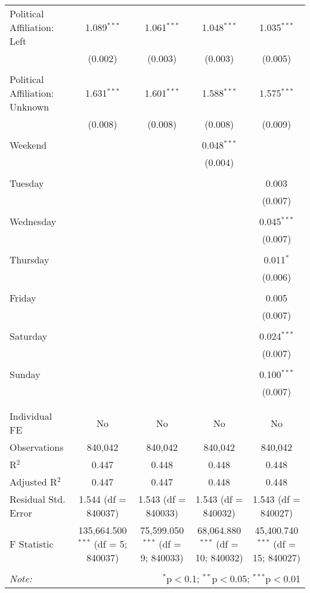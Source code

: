 \documentclass[
]{article}
\begin{document}
\begin{table}[!htbp]
{\begin{tabular}{@{\extracolsep{5pt}}lcccc}
 Political Affiliation: Left & 1.089$^{***}$ & 1.061$^{***}$ & 1.048$^{***}$ & 1.035$^{***}$ \\ 
  & (0.002) & (0.003) & (0.003) & (0.005) \\ 
  & & & & \\ 
 Political Affiliation: Unknown & 1.631$^{***}$ & 1.601$^{***}$ & 1.588$^{***}$ & 1.575$^{***}$ \\ 
  & (0.008) & (0.008) & (0.008) & (0.009) \\ 
  & & & & \\ 
 Weekend &  &  & 0.048$^{***}$ &  \\ 
  &  &  & (0.004) &  \\ 
  & & & & \\ 
 Tuesday &  &  &  & 0.003 \\ 
  &  &  &  & (0.007) \\ 
  & & & & \\ 
 Wednesday &  &  &  & 0.045$^{***}$ \\ 
  &  &  &  & (0.007) \\ 
  & & & & \\ 
 Thursday &  &  &  & 0.011$^{*}$ \\ 
  &  &  &  & (0.006) \\ 
  & & & & \\ 
 Friday &  &  &  & 0.005 \\ 
  &  &  &  & (0.007) \\ 
  & & & & \\ 
 Saturday &  &  &  & 0.024$^{***}$ \\ 
  &  &  &  & (0.007) \\ 
  & & & & \\ 
 Sunday &  &  &  & 0.100$^{***}$ \\ 
  &  &  &  & (0.007) \\ 
  & & & & \\ 
\hline \\[-1.8ex] 
Individual FE & No & No & No & No \\ 
Observations & 840,042 & 840,042 & 840,042 & 840,042 \\ 
R$^{2}$ & 0.447 & 0.448 & 0.448 & 0.448 \\ 
Adjusted R$^{2}$ & 0.447 & 0.447 & 0.448 & 0.448 \\ 
Residual Std. Error & 1.544 (df = 840037) & 1.543 (df = 840033) & 1.543 (df = 840032) & 1.543 (df = 840027) \\ 
F Statistic & 135,664.500$^{***}$ (df = 5; 840037) & 75,599.050$^{***}$ (df = 9; 840033) & 68,064.880$^{***}$ (df = 10; 840032) & 45,400.740$^{***}$ (df = 15; 840027) \\ 
\hline 
\hline \\[-1.8ex] 
\textit{Note:}  & \multicolumn{4}{r}{$^{*}$p$<$0.1; $^{**}$p$<$0.05; $^{***}$p$<$0.01} \\ 
\end{tabular}
} 
\end{table} 
\newpage
\end{document}
